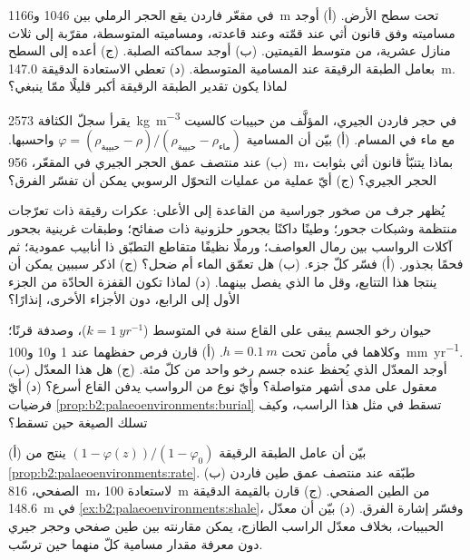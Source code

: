 \begin{exercise}[$\star\star$]\label{exo:b2:palaeoenvironments:7}
في مقعّر فاردن يقع الحجر الرملي بين 1046 و\qty{1166}{m} تحت سطح الأرض. (أ)
أوجد مساميته وفق قانون أثي عند قمّته وعند قاعدته، ومساميته المتوسطة، مقرّبة إلى
ثلاث منازل عشرية، من متوسط القيمتين. (ب) أوجد سماكته الصلبة. (ج) أعده إلى
السطح بعامل الطبقة الرقيقة عند المسامية المتوسطة. (د) تعطي الاستعادة الدقيقة
\qty{147.0}{m}. لماذا يكون تقدير الطبقة الرقيقة أكبر قليلًا ممّا ينبغي؟
\end{exercise}

\begin{exercise}[$\star\star$]\label{exo:b2:palaeoenvironments:8}
يقرأ سجلّ الكثافة \qty{2573}{kg.m^{-3}} في حجر فاردن الجيري، المؤلَّف من حبيبات كالسيت مع
ماء في المسام. (أ) بيّن أن المسامية $\varphi = (\rho_{\text{حبيبة}} -
\rho)/(\rho_{\text{حبيبة}} - \rho_{\text{ماء}})$ واحسبها. (ب) عند منتصف عمق
الحجر الجيري في المقعّر، \qty{956}{m}، بماذا يتنبّأ قانون أثي بثوابت الحجر الجيري؟
(ج) أيّ عملية من عمليات التحوّل الرسوبي يمكن أن تفسّر الفرق؟
\end{exercise}

\begin{exercise}[$\star\star$]\label{exo:b2:palaeoenvironments:9}
يُظهر جرف من صخور جوراسية من القاعدة إلى الأعلى: عكرات رقيقة ذات تعرّجات منتظمة وشبكات
جحور؛ وطينًا داكنًا بجحور حلزونية ذات صفائح؛ وطبقات غرينية بجحور آكلات الرواسب بين
رمال العواصف؛ ورملًا نظيفًا متقاطع التطبّق ذا
أنابيب عمودية؛ ثم فحمًا بجذور. (أ) فسّر كلّ جزء. (ب) هل تعمّق الماء أم
ضحل؟ (ج) اذكر سببين يمكن أن ينتجا هذا التتابع، وقل ما الذي يفصل
بينهما. (د) لماذا تكون القفزة الحادّة من الجزء الأول إلى الرابع، دون الأجزاء الأخرى،
إنذارًا؟
\end{exercise}

\begin{exercise}[$\star\star\star$]\label{exo:b2:palaeoenvironments:10}
حيوان رخو الجسم يبقى على القاع سنة في المتوسط ($k = \qty{1}{yr^{-1}}$)،
وصدفة قرنًا؛ وكلاهما في مأمن تحت $h = \qty{0.1}{m}$. (أ) قارن فرص
حفظهما عند 1 و10 و\qty{100}{mm.yr^{-1}}. (ب) أوجد المعدّل الذي يُحفظ عنده جسم رخو واحد من كلّ
مئة. (ج) هل هذا المعدّل معقول على مدى أشهر متواصلة؟ وأيّ نوع من الرواسب يدفن
القاع أسرع؟ (د) أيّ فرضيات \cref{prop:b2:palaeoenvironments:burial} تسقط في مثل هذا
الراسب، وكيف تسلك الصيغة حين تسقط؟
\end{exercise}

\begin{exercise}[$\star\star\star$]\label{exo:b2:palaeoenvironments:11}
(أ) بيّن أن عامل الطبقة الرقيقة $(1 - \varphi(z))/(1 - \varphi_0)$ ينتج من
\cref{prop:b2:palaeoenvironments:rate}. (ب) طبّقه عند منتصف عمق طين فاردن الصفحي،
\qty{816}{m}، لاستعادة \qty{100}{m} من الطين الصفحي. (ج) قارن بالقيمة الدقيقة \qty{148.6}{m} في
\cref{ex:b2:palaeoenvironments:shale}، وفسّر إشارة الفرق. (د) بيّن أن
معدّل الحبيبات، بخلاف معدّل الراسب الطازج، يمكن مقارنته بين طين صفحي وحجر جيري
دون معرفة مقدار مسامية كلّ منهما حين ترسّب.
\end{exercise}

